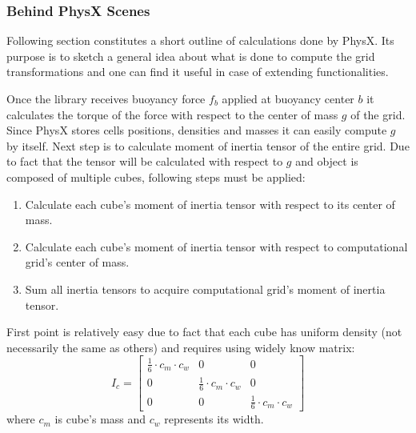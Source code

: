 \documentclass{report}
\begin{document}
\subsubsection{Behind PhysX Scenes} \label{subsub:physX}
Following section constitutes a short outline of calculations done by PhysX. Its purpose is to sketch a general idea about what is done to compute the grid transformations and one can find it useful in case of extending functionalities.

Once the library receives buoyancy force $f_b$ applied at buoyancy center $b$ it calculates the torque of the force with respect to the center of mass $g$ of the grid. Since PhysX stores cells positions, densities and masses it can easily compute $g$ by itself. Next step is to calculate moment of inertia tensor of the entire grid. Due to fact that the tensor will be calculated with respect to $g$ and object is composed of multiple cubes, following steps must be applied:  
\begin{enumerate}
\item Calculate each cube's moment of inertia tensor with respect to its center of mass.
\item Calculate each cube's moment of inertia tensor with respect to computational grid's center of mass.
\item Sum all inertia tensors to acquire computational grid's moment of inertia tensor.
\end{enumerate} 
First point is relatively easy due to fact that each cube has uniform density (not necessarily the same as others) and requires using widely know matrix:
\[
I_c=
  \begin{bmatrix}
    \frac{1}{6} \cdot c_m \cdot c_w & 0 & 0 \\
    0 & \frac{1}{6} \cdot c_m \cdot c_w & 0 \\
    0 & 0 & \frac{1}{6} \cdot c_m \cdot c_w
  \end{bmatrix}
\]
where $c_m$ is cube's mass and $c_w$ represents its width.
\end{document}
